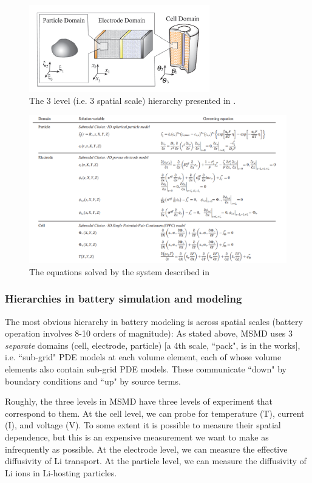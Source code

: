 \documentclass[11pt]{article}
\begin{document}
\begin{figure}
  \includegraphics[width=0.7\textwidth]{msmdfig1.png}
\caption{The 3 level (i.e. 3 spatial scale) hierarchy presented in \cite{Kim-etal:2011}.}
\label{fig1}       
\end{figure}

\begin{figure}
  \includegraphics[width=1.1\textwidth]{msmdeqns.png}
\caption{The equations solved by the system described in \cite{Kim-etal:2011}}
\label{fig2}       
\end{figure}


\subsubsection*{Hierarchies in battery simulation and modeling}

The most obvious hierarchy in battery modeling is across spatial scales (battery operation involves 8-10 orders of magnitude):
As stated above, MSMD uses 3 \emph{separate} domains (cell, electrode, particle) [a 4th scale, ``pack", is in the works],
i.e. ``sub-grid" PDE models at each volume element, each of whose volume elements also contain sub-grid PDE models.
These communicate ``down" by boundary conditions and ``up" by
source terms.  

Roughly, the three levels in MSMD have three levels of experiment that correspond to them.  At the cell level, we can probe for
temperature (T), current (I), and voltage (V).  To some extent it is possible to measure their spatial dependence, but this is an expensive measurement we want to make as infrequently as possible.  At the electrode level, we can measure the effective diffusivity 
of Li transport.  At the particle level, we can measure the diffusivity of Li ions in Li-hosting particles.
\end{document}
